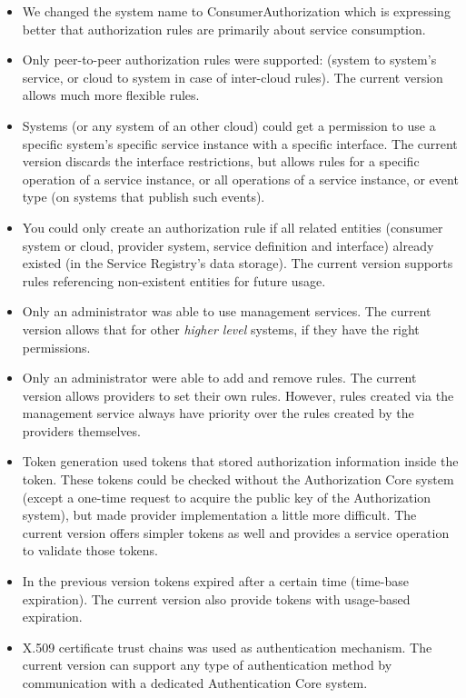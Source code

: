 \documentclass[a4paper]{arrowhead}
\begin{document}
\begin{itemize}
    \item We changed the system name to ConsumerAuthorization which is expressing better that authorization rules are primarily about service consumption. 
    \item Only peer-to-peer authorization rules were supported: (system to system's service, or cloud to system in case of inter-cloud rules). The current version allows much more flexible rules.
    \item Systems (or any system of an other cloud) could get a permission to use a specific system's specific service instance with a specific interface. The current version discards the interface restrictions, but allows rules for a specific operation of a service instance, or all operations of a service instance, or event type (on systems that publish such events). 
    \item You could only create an authorization rule if all related entities (consumer system or cloud, provider system, service definition and interface) already existed (in the Service Registry's data storage). The current version supports rules referencing non-existent entities for future usage.
    \item Only an administrator was able to use management services. The current version allows that for other \textit{higher level} systems, if they have the right permissions.
    \item Only an administrator were able to add and remove rules. The current version allows providers to set their own rules. However, rules created via the management service always have priority over the rules created by the providers themselves.
    \item Token generation used tokens that stored authorization information inside the token. These tokens could be checked without the Authorization Core system (except a one-time request to acquire the public key of the Authorization system), but made provider implementation a little more difficult. The current version offers simpler tokens as well and provides a service operation to validate those tokens.
    \item In the previous version tokens expired after a certain time (time-base expiration). The current version also provide tokens with usage-based expiration.
    \item X.509 certificate trust chains was used as authentication mechanism. The current version can support any type of authentication method by communication with a dedicated Authentication Core system.
\end{itemize}
\end{document}
